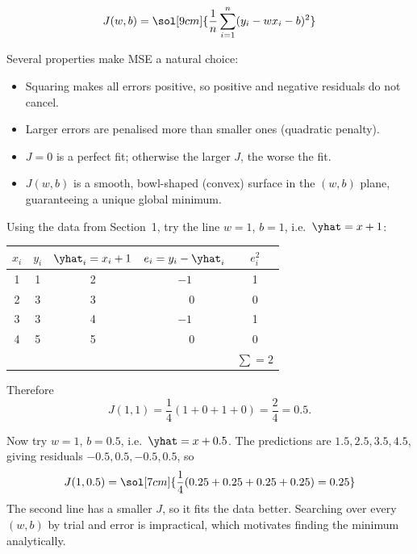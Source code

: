 \documentclass[12pt, a4paper]{article}
\begin{document}
\begin{equation}
  J(w, b) = \sol[9cm]{\frac{1}{n}\sum_{i=1}^{n}(y_i - wx_i - b)^2}
  \label{eq:mse}
\end{equation}

Several properties make MSE a natural choice:
\begin{itemize}[nosep]
  \item Squaring makes all errors positive, so positive and negative residuals
        do not cancel.
  \item Larger errors are penalised more than smaller ones (quadratic penalty).
  \item $J = 0$ is a perfect fit; otherwise the larger $J$, the worse the fit.
  \item $J(w,b)$ is a smooth, bowl-shaped (convex) surface in the
        $(w, b)$ plane, guaranteeing a unique global minimum.
\end{itemize}

\begin{example}
  Using the data from Section~1, try the line $w = 1$, $b = 1$, i.e.\
  $\yhat = x + 1$:

  \begin{center}
    \begin{tabular}{ccccc}
      \toprule
      $x_i$ & $y_i$ & $\yhat_i = x_i + 1$ & $e_i = y_i - \yhat_i$ & $e_i^2$    \\
      \midrule
      1     & 1     & 2                   & $-1$                  & 1          \\
      2     & 3     & 3                   & $\phantom{-}0$        & 0          \\
      3     & 3     & 4                   & $-1$                  & 1          \\
      4     & 5     & 5                   & $\phantom{-}0$        & 0          \\
      \midrule
            &       &                     &                       & $\sum = 2$ \\
      \bottomrule
    \end{tabular}
  \end{center}

  Therefore
  \[
    J(1, 1) = \frac{1}{4}(1 + 0 + 1 + 0) = \frac{2}{4} = 0.5.
  \]

  Now try $w = 1$, $b = 0.5$, i.e.\ $\yhat = x + 0.5$. The predictions are
  $1.5, 2.5, 3.5, 4.5$, giving residuals $-0.5, 0.5, -0.5, 0.5$, so
  \[
    J(1, 0.5) = \sol[7cm]{\frac{1}{4}(0.25 + 0.25 + 0.25 + 0.25) = 0.25}
  \]
  The second line has a smaller $J$, so it fits the data better. Searching
  over every $(w, b)$ by trial and error is impractical, which motivates
  finding the minimum analytically.
\end{example}
\end{document}
